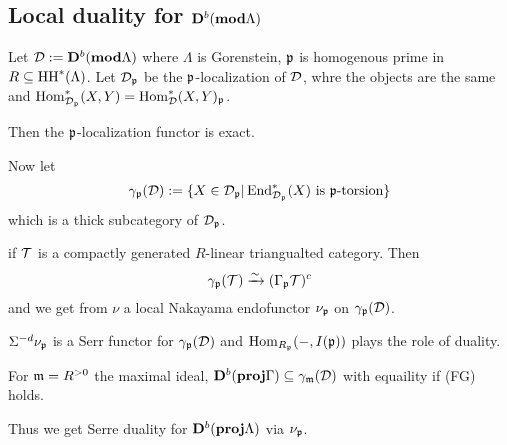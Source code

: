 \documentclass[12pt]{article}
\newcommand{\p}{\frakp}
\newcommand{\m}{\frakm}
\begin{document}
\subsection{Local duality for \texorpdfstring{$\mathbf{D}^b(\mathbf{mod}\Lambda)$}{Db(mod Lambda)}}
Let $\mathcal{D}:=\mathbf{D}^b(\mathbf{mod}\Lambda)$ where $\Lambda$ is Gorenstein, $\p$ is homogenous prime in $R\subseteq\operatorname{HH}^\ast(\Lambda)$. Let $\calD_\p$ be the $\p$-localization
of $\mathcal{D}$, whre the objects are the same and $\Hom_{\calD_\p}^\ast(X,Y)=\Hom^\ast_\calD(X,Y)_\p$.

Then the $\p$-localization functor is exact.

Now let
\[\gamma_\p(\calD):=\{X\in\calD_\p|\End^\ast_{\calD_\p}(X)\text{ is $\p$-torsion}\}\]
which is a thick subcategory of $\calD_\p$.
\begin{rmk}
	if $\mathcal{T}$ is a compactly generated $R$-linear triangualted category. Then 
	\[\gamma_\p(\calT)\xrightarrow{\sim}(\Gamma_\p\calT)^c\]
	and we get from $\nu$ a local Nakayama endofunctor $\nu_\p$ on $\gamma_\p(\calD)$.
\end{rmk}
\begin{thm}
	$\Sigma^{-d}\nu_\p$ is a Serr functor for $\gamma_\p(\calD)$ and $\Hom_{R_\p}(-,I(\p))$ plays the role of duality.
\end{thm}

For $\m= R^{>0}$ the maximal ideal, $\Db(\mathbf{proj}\Gamma)\subseteq\gamma_\m(\calD)$ with equaility if (FG) holds.

Thus we get Serre duality for $\mathbf{D}^b(\mathbf{proj}\Lambda)$ via $\nu_\p$.
\end{document}
